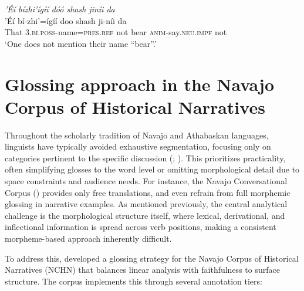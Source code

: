 \ea\label{ex:intro5}
    \textit{’Éí bízhi’ígíí dóó shash jiníi da}\\
    \gll \textup{’Éí} \textup{bí-zhi’=ígíí} \textup{doo} \textup{shash} \textup{ji-níi} \textup{da}\\
	That	3.\textsc{bi}.\textsc{poss}-name=\textsc{pres.ref} not bear \textsc{anim}-say.\textsc{neu}.\textsc{impf}	not\\
    \glt `One does not mention their name ``bear''.' 
\z

\section{Glossing approach in the Navajo Corpus of Historical Narratives}\label{sec:conventions}

Throughout the scholarly tradition of Navajo and Athabaskan languages, linguists have typically avoided exhaustive segmentation, focusing only on categories pertinent to the specific discussion (\cite{Denk:2024aq}; \cite{Hargus:2020wv}). This prioritizes practicality, often simplifying glosses to the word level or omitting morphological detail due to space constraints and audience needs. For instance, the Navajo Conversational Corpus (\cite{Mithun:2009nl}) provides only free translations, and even \citet{Young:1987uj} refrain from full morphemic glossing in narrative examples. As mentioned previously, the central analytical challenge is the morphological structure itself, where lexical, derivational, and inflectional information is spread across verb positions, making a consistent morpheme-based approach inherently difficult.

To address this, \citet{Denk:2025zp} developed a glossing strategy for the Navajo Corpus of Historical Narratives (NCHN) that balances linear analysis with faithfulness to surface structure. The corpus implements this through several annotation tiers:

